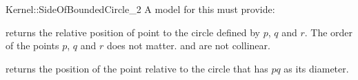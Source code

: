 \begin{ccRefFunctionObjectConcept}{Kernel::SideOfBoundedCircle_2}
A model for this must provide:


         {returns the relative position of point 
          to the circle defined by $p$, $q$ and $r$. The order
          of the points $p$, $q$ and $r$ does not matter.
          \ccPrecond {} and  are not collinear.}

         {returns the position of the point  relative to the circle
          that has $pq$ as its diameter.}

\ccSeeAlso
{} \\

\end{ccRefFunctionObjectConcept}
